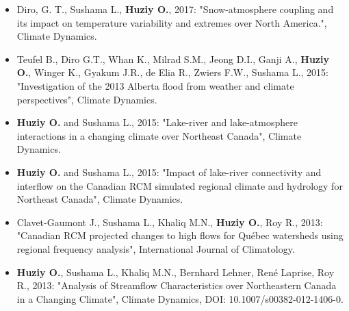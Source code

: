 \vspace{\vertspace}


{
\renewcommand{\labelitemi}{}
\begin{itemize}

    \item Diro, G. T., Sushama L., \textbf{Huziy O.}, 2017: "Snow-atmosphere coupling and its impact
    on temperature variability and extremes over North America.", Climate Dynamics.

    \item Teufel B., Diro G.T., Whan K., Milrad S.M., Jeong D.I., Ganji A.,
    \textbf{Huziy O.}, Winger K., Gyakum J.R., de Elia R., Zwiers F.W., Sushama
    L., 2015: "Investigation of the 2013 Alberta flood from weather and climate
    perspectives", Climate Dynamics.

    \item \textbf{Huziy O.} and Sushama L., 2015: "Lake-river and
    lake-atmosphere interactions in a changing climate over Northeast Canada",
    Climate Dynamics.

    \item \textbf{Huziy O.} and Sushama L., 2015: "Impact of lake-river
    connectivity and interflow on the Canadian RCM simulated regional climate
    and hydrology for Northeast Canada", Climate Dynamics.

    \item Clavet-Gaumont J., Sushama L., Khaliq M.N.,
    \textbf{Huziy O.}, Roy R., 2013: "Canadian RCM projected changes to high
    flows for Québec watersheds using regional frequency analysis", International Journal of Climatology.

    \item \textbf{Huziy O.}, Sushama L., Khaliq M.N., Bernhard
    Lehner, René Laprise, Roy R., 2013: "Analysis of Streamflow Characteristics over Northeastern Canada
     in a Changing Climate", Climate Dynamics, DOI:
     10.1007/s00382-012-1406-0.

\end{itemize}
}
